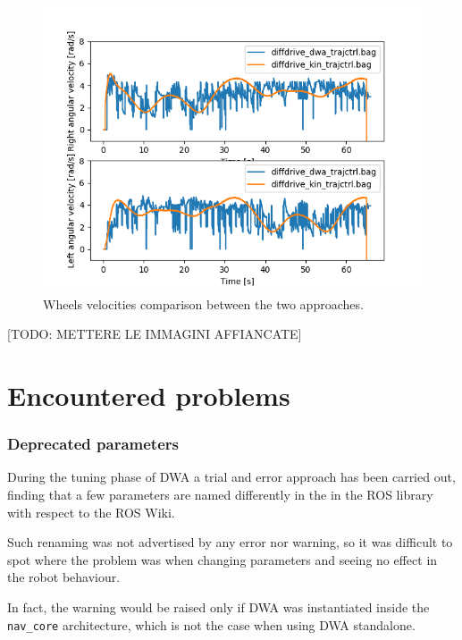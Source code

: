 \documentclass[11pt,a4paper]{article}
\begin{document}
\begin{figure}[H]
    \centering
    \includegraphics[scale=0.4]{comparison/Wheels_Velocities.png}
    \caption{Wheels velocities comparison between the two approaches.}
\end{figure}

[TODO: METTERE LE IMMAGINI AFFIANCATE]



\section{Encountered problems}

\subsubsection{Deprecated parameters}

During the tuning phase of DWA a trial and error approach has been carried out, finding that
a few parameters are named differently in the in the ROS library with respect to the ROS Wiki.

Such renaming was not advertised by any error nor warning, so it was difficult to spot where the problem
was when changing parameters and seeing no effect in the robot behaviour.

In fact, the warning would be raised only if DWA was instantiated inside the \texttt{nav\_core} architecture,
which is not the case when using DWA standalone.\\
\end{document}
